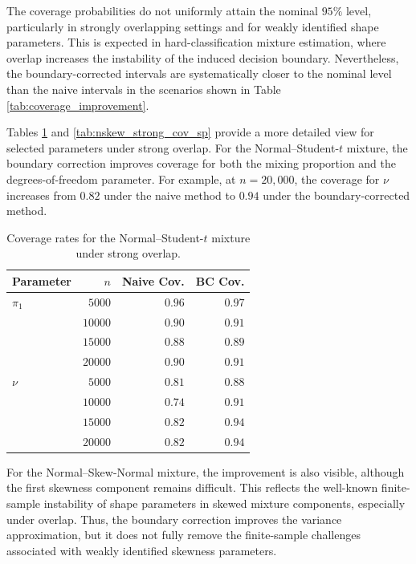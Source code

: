 \documentclass[pdflatex,sn-mathphys-ay]{sn-jnl}%
\theoremstyle{thmstyleone}%
\theoremstyle{thmstyletwo}%
\theoremstyle{thmstylethree}%
\begin{document}
The coverage probabilities do not uniformly attain the nominal $95\%$ level, particularly in strongly overlapping settings and for weakly identified shape parameters. This is expected in hard-classification mixture estimation, where overlap increases the instability of the induced decision boundary. Nevertheless, the boundary-corrected intervals are systematically closer to the nominal level than the naive intervals in the scenarios shown in Table \ref{tab:coverage_improvement}.

Tables \ref{tab:nt_strong_cov_sp} and \ref{tab:nskew_strong_cov_sp} provide a more detailed view for selected parameters under strong overlap. For the Normal--Student-$t$ mixture, the boundary correction improves coverage for both the mixing proportion and the degrees-of-freedom parameter. For example, at $n=20,000$, the coverage for $\nu$ increases from $0.82$ under the naive method to $0.94$ under the boundary-corrected method.

\begin{table}[htbp]
\centering
\caption{\label{tab:nt_strong_cov_sp}Coverage rates for the Normal--Student-$t$ mixture under strong overlap.}
\begin{tabular}{lrrr}
\toprule
Parameter & $n$ & Naive Cov. & BC Cov. \\
\midrule
$\pi_1$ & $5000$ & $0.96$ & $0.97$ \\
 & $10000$ & $0.90$ & $0.91$ \\
 & $15000$ & $0.88$ & $0.89$ \\
 & $20000$ & $0.90$ & $0.91$ \\
$\nu$ & $5000$ & $0.81$ & $0.88$ \\
 & $10000$ & $0.74$ & $0.91$ \\
 & $15000$ & $0.82$ & $0.94$ \\
 & $20000$ & $0.82$ & $0.94$ \\
\bottomrule
\end{tabular}
\end{table}

For the Normal--Skew-Normal mixture, the improvement is also visible, although the first skewness component remains difficult. This reflects the well-known finite-sample instability of shape parameters in skewed mixture components, especially under overlap. Thus, the boundary correction improves the variance approximation, but it does not fully remove the finite-sample challenges associated with weakly identified skewness parameters.
\end{document}
